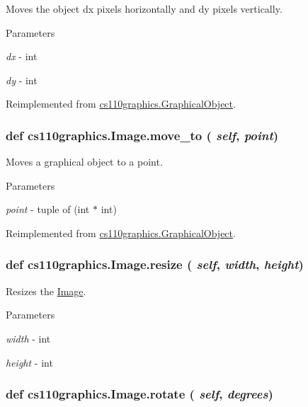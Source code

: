 Moves the object dx pixels horizontally and dy pixels vertically. 
\begin{DoxyParams}{Parameters}
\item[{\em dx}]-\/ int \item[{\em dy}]-\/ int \end{DoxyParams}


Reimplemented from \hyperlink{classcs110graphics_1_1GraphicalObject_aa64d270fb83efa4a54e1a7953512f9cd}{cs110graphics.GraphicalObject}.\hypertarget{classcs110graphics_1_1Image_a4b2e775fbb0cb523f6bc09028dc05c65}{
\subsubsection[{move\_\-to}]{\setlength{\rightskip}{0pt plus 5cm}def cs110graphics.Image.move\_\-to ( {\em self}, \/   {\em point})}}
\label{classcs110graphics_1_1Image_a4b2e775fbb0cb523f6bc09028dc05c65}


Moves a graphical object to a point. 
\begin{DoxyParams}{Parameters}
\item[{\em point}]-\/ tuple of (int $\ast$ int) \end{DoxyParams}


Reimplemented from \hyperlink{classcs110graphics_1_1GraphicalObject_abe2d480265df7ac9447205c52c6946df}{cs110graphics.GraphicalObject}.\hypertarget{classcs110graphics_1_1Image_a0754151035bb2892f0cd3895b64488fa}{
\subsubsection[{resize}]{\setlength{\rightskip}{0pt plus 5cm}def cs110graphics.Image.resize ( {\em self}, \/   {\em width}, \/   {\em height})}}
\label{classcs110graphics_1_1Image_a0754151035bb2892f0cd3895b64488fa}


Resizes the \hyperlink{classcs110graphics_1_1Image}{Image}. 
\begin{DoxyParams}{Parameters}
\item[{\em width}]-\/ int \item[{\em height}]-\/ int \end{DoxyParams}
\hypertarget{classcs110graphics_1_1Image_ac58717d68279e536cee608e2bdfc6aa8}{
\subsubsection[{rotate}]{\setlength{\rightskip}{0pt plus 5cm}def cs110graphics.Image.rotate ( {\em self}, \/   {\em degrees})}}
\label{classcs110graphics_1_1Image_ac58717d68279e536cee608e2bdfc6aa8}


